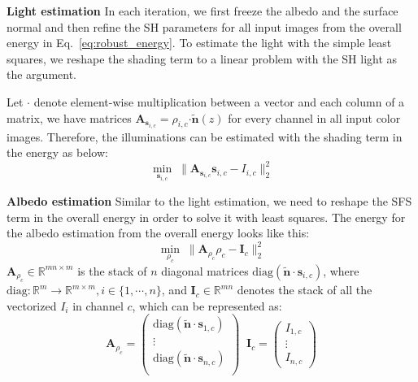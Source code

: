 \textbf{Light estimation}
In each iteration, we first freeze the albedo and the surface normal and then refine the SH parameters for all input images from the overall energy in Eq.~\ref{eq:robust_energy}.
To estimate the light with the simple least squares, we reshape the shading term to a linear problem with the SH light as the argument.

Let $\boldsymbol{\cdot}$ denote element-wise multiplication between a vector and each column of a matrix, we have matrices $\mathbf{A}_{\mathbf{s}_{i,c}} = \rho_{i,c} \boldsymbol{\cdot} \tilde{\mathbf{n}}(z)$ for every channel in all input color images. 
Therefore, the illuminations can be estimated with the shading term in the energy as below:
\begin{equation}\label{eq:robust_light_estimate2}
    \min_{\mathbf{s}_{i,c}} \; \lVert \mathbf{A}_{\mathbf{s}_{i,c}}\mathbf{s}_{i,c}  - I_{i,c} \rVert_2^2
\end{equation}

\textbf{Albedo estimation}
Similar to the light estimation, we need to reshape the SFS term in the overall energy in order to solve it with least squares.
The energy for the albedo estimation from the overall energy looks like this:
\begin{equation}\label{eq:robust_albedo_estimate}
    \min_{\rho_c} \; \lVert \mathbf{A}_{\rho_c}\rho_c - \mathbf{I}_c \rVert^2_2 
\end{equation}
$ \mathbf{A}_{\rho_c} \in \mathbb{R}^{mn \times m}$ is the stack of $n$ diagonal matrices $\text{diag}(\tilde{\mathbf{n}} \cdot \mathbf{s}_{i,c})$, where $\text{diag} : \mathbb{R}^m \rightarrow \mathbb{R}^{m\times m}, i \in \{1, \cdots, n\}$, and $\mathbf{I}_c \in \mathbb{R}^{mn}$ denotes the stack of all the vectorized $I_i$ in channel $c$, which can be represented as:
\begin{equation}
    \mathbf{A}_{\rho_c} = \begin{pmatrix} \text{diag}(\tilde{\mathbf{n}} \cdot \mathbf{s}_{1,c}) \\ \vdots \\ \text{diag}(\tilde{\mathbf{n}} \cdot \mathbf{s}_{n,c})\\\end{pmatrix} \; \;
    \mathbf{I}_c = \begin{pmatrix} I_{1,c} \\ \vdots \\ I_{n,c} \end{pmatrix}
\end{equation}

